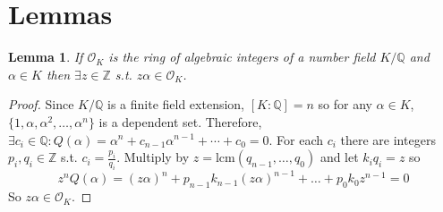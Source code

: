 \documentclass[12pt]{extarticle}
\newcommand{\Z}{\mathbb{Z}}
\newcommand{\Q}{\mathbb{Q}}
\newcommand{\ints}[1]{\mathcal{O}_{#1}}
\newtheorem{lemma}[theorem]{Lemma}
\begin{document}
\section*{Lemmas}

\begin{lemma} \label{multintoints}
If $\ints{K}$ is the ring of algebraic integers of a number field $K/\Q$ and $\alpha \in K$ then $\exists z \in \Z$ s.t. $z \alpha \in \ints{K}$. 
\end{lemma}
\begin{proof}
Since $K/\Q$ is a finite field extension, $[K : \Q] = n$ so for any $\alpha \in K$, $\{1, \alpha, \alpha^2, \dots, \alpha^n\}$ is a dependent set. Therefore, $\exists c_i \in \Q :  Q(\alpha) = \alpha^n + c_{n-1} \alpha^{n-1} + \cdots + c_0 = 0$. For each $c_i$ there are integers $p_i, q_i \in \Z$ s.t. $c_i = \frac{p_i}{q_i}$. Multiply by $z = \text{lcm}(q_{n-1}, \dots, q_0)$ and let $k_i q_i = z$ so \[z^n Q(\alpha) = (z \alpha)^n + p_{n-1} k_{n-1} (z \alpha)^{n-1} + \dots + p_0 k_0 z^{n-1} = 0\]
So $z \alpha \in \ints{K}$.     
\end{proof}
\end{document}

